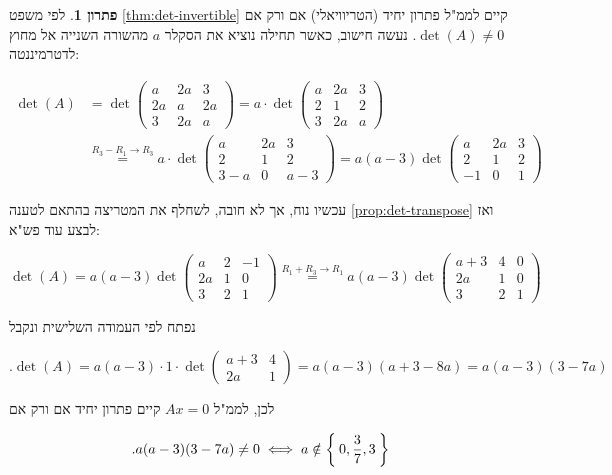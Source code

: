 \documentclass[12pt]{report}
\theoremstyle{plain}
\theoremstyle{definition}
\newtheorem*{solution}{פתרון}
\newcommand{\0}{\mathbf{0}}
\begin{document}
\begin{solution}
לפי משפט
\ref{thm:det-invertible}
קיים לממ"ל פתרון יחיד (הטריוויאלי) אם ורק אם
$\det(A)\neq 0$.
נעשה חישוב, כאשר תחילה נוציא את הסקלר 
$a$
מהשורה השנייה אל מחוץ לדטרמיננטה:

$$
\begin{aligned}
\det(A)&=\det\!\begin{pmatrix}
a & 2a & 3 \\
2a & a & 2a \\
3 & 2a & a
\end{pmatrix}=a\cdot\det\!\begin{pmatrix}
a & 2a & 3 \\
2 & 1 & 2 \\
3 & 2a & a
\end{pmatrix}\\
&\overset{R_3 - R_1 \to R_3}{=}a\cdot\det\!\begin{pmatrix}
a & 2a & 3 \\
2 & 1 & 2 \\
3-a & 0 & a-3
\end{pmatrix}
=a(a-3)\det\!\begin{pmatrix}
a & 2a & 3 \\
2 & 1 & 2 \\
-1 & 0 & 1
\end{pmatrix}
\end{aligned}
$$

עכשיו נוח, אך לא חובה, לשחלף את המטריצה בהתאם לטענה 
\ref{prop:det-transpose}
ואז לבצע עוד פש"א:

$$
\det(A)=a(a-3)\det\!\begin{pmatrix}
a & 2 & -1 \\
2a & 1 & 0 \\
3 & 2 & 1
\end{pmatrix}\overset{R_1+R_3\to R_1}{=}a(a-3)\det\!\begin{pmatrix}
a+3 & 4 & 0 \\
2a & 1 & 0 \\
3 & 2 & 1
\end{pmatrix}
$$

נפתח לפי העמודה השלישית ונקבל

$$
.\det(A)=a(a-3)\cdot 1\cdot\det\!\begin{pmatrix}
a+3 & 4 \\
2a & 1
\end{pmatrix}=a(a-3)(a+3-8a)=a(a-3)(3-7a)
$$

לכן, לממ"ל
$Ax=0$
קיים פתרון יחיד אם ורק אם

$$
.a(a-3)(3-7a)\neq 0 \iff a\notin\Set{0,\frac{3}{7},3}
$$

\end{solution}
\end{document}
